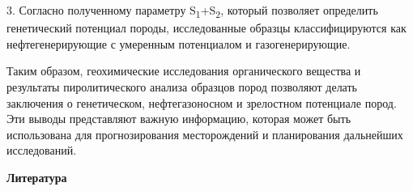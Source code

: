 \begin{multicols}{2}
3. Согласно полученному параметру S\textsubscript{1}+S\textsubscript{2},
который позволяет определить генетический потенциал породы,
исследованные образцы классифицируются как нефтегенерирующие с умеренным
потенциалом и газогенерирующие.

Таким образом, геохимические исследования органического вещества и
результаты пиролитического анализа образцов пород позволяют делать
заключения о генетическом, нефтегазоносном и зрелостном потенциале
пород. Эти выводы представляют важную информацию, которая может быть
использована для прогнозирования месторождений и планирования дальнейших
исследований.
\end{multicols}

\begin{center}
{\bfseries Литература}
\end{center}

